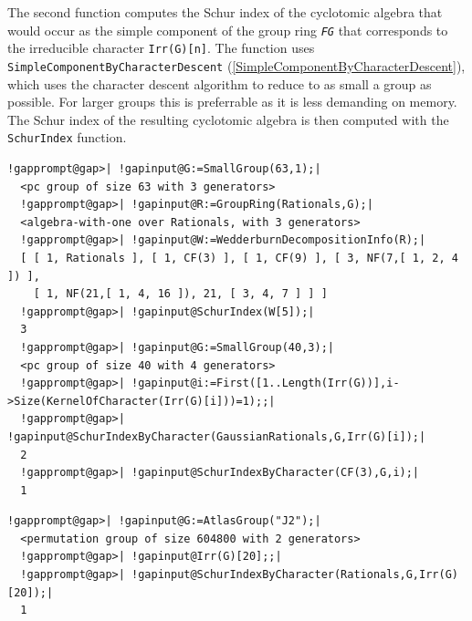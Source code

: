 \documentclass[a4paper,11pt]{report}
\begin{document}
{{{ The second function computes the Schur index of the cyclotomic algebra that
would occur as the simple component of the group ring \mbox{\texttt{\mdseries\slshape FG}} that corresponds to the irreducible character \texttt{Irr(G)[n]}. The function uses \texttt{SimpleComponentByCharacterDescent} (\ref{SimpleComponentByCharacterDescent}), which uses the character descent algorithm to reduce to as small a group as
possible. For larger groups this is preferrable as it is less demanding on
memory. The Schur index of the resulting cyclotomic algebra is then computed
with the \texttt{SchurIndex} function. 

 
\begin{Verbatim}[commandchars=!@|,fontsize=\small,frame=single,label=Example]
  !gapprompt@gap>| !gapinput@G:=SmallGroup(63,1);|
  <pc group of size 63 with 3 generators>
  !gapprompt@gap>| !gapinput@R:=GroupRing(Rationals,G);|
  <algebra-with-one over Rationals, with 3 generators>
  !gapprompt@gap>| !gapinput@W:=WedderburnDecompositionInfo(R);|
  [ [ 1, Rationals ], [ 1, CF(3) ], [ 1, CF(9) ], [ 3, NF(7,[ 1, 2, 4 ]) ], 
    [ 1, NF(21,[ 1, 4, 16 ]), 21, [ 3, 4, 7 ] ] ]
  !gapprompt@gap>| !gapinput@SchurIndex(W[5]);|
  3
  !gapprompt@gap>| !gapinput@G:=SmallGroup(40,3);|
  <pc group of size 40 with 4 generators>
  !gapprompt@gap>| !gapinput@i:=First([1..Length(Irr(G))],i->Size(KernelOfCharacter(Irr(G)[i]))=1);;|
  !gapprompt@gap>| !gapinput@SchurIndexByCharacter(GaussianRationals,G,Irr(G)[i]);|
  2
  !gapprompt@gap>| !gapinput@SchurIndexByCharacter(CF(3),G,i);|
  1
\end{Verbatim}
 
\begin{Verbatim}[commandchars=!@|,fontsize=\small,frame=single,label=Example]
  !gapprompt@gap>| !gapinput@G:=AtlasGroup("J2");|
  <permutation group of size 604800 with 2 generators>
  !gapprompt@gap>| !gapinput@Irr(G)[20];;|
  !gapprompt@gap>| !gapinput@SchurIndexByCharacter(Rationals,G,Irr(G)[20]);|
  1
\end{Verbatim}
 }

 

}}
\end{document}
